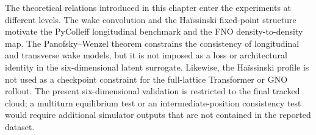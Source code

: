 The theoretical relations introduced in this chapter enter the experiments at different levels. The wake convolution and the Haïssinski fixed-point structure motivate the PyColleff longitudinal benchmark and the FNO density-to-density map. The Panofsky–Wenzel theorem constrains the consistency of longitudinal and transverse wake models, but it is not imposed as a loss or architectural identity in the six-dimensional latent surrogate. Likewise, the Haïssinski profile is not used as a checkpoint constraint for the full-lattice Transformer or GNO rollout. The present six-dimensional validation is restricted to the final tracked cloud; a multiturn equilibrium test or an intermediate-position consistency test would require additional simulator outputs that are not contained in the reported dataset.

